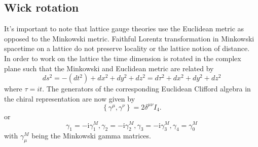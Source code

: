 \documentclass[a4paper,10pt]{book}
\begin{document}
\subsection{Wick rotation}
It's important to note that lattice gauge theories use the Euclidean metric as opposed to the Minkowski metric. Faithful Lorentz transformation in Minkowski spacetime on a lattice do not preserve locality or the lattice notion of distance.\\In order to work on the lattice the time dimension is rotated in the complex plane such that the Minkowski and Euclidean metric are related by 
\begin{equation}
d s^{2}=-\left(d t^{2}\right)+d x^{2}+d y^{2}+d z^{2} = d \tau^{2}+d x^{2}+d y^{2}+d z^{2} 
\end{equation}
where $\tau = it$. The generators of the corresponding Euclidean Clifford algebra in the chiral representation are now given by 
\begin{equation}
\left\{\gamma^{\mu}, \gamma^{\nu}\right\}=2 \delta^{\mu \nu} I_{4}.
\end{equation}
or 
\begin{equation}
\gamma_{1}=-\mathrm{i} \gamma_{1}^{M}, \gamma_{2}=-\mathrm{i} \gamma_{2}^{M}, \gamma_{3}=-\mathrm{i} \gamma_{3}^{M}, \gamma_{4}=\gamma_{0}^{M}
\end{equation}
with $\gamma_{\mu}^{M}$ being the Minkowski gamma matrices.
\end{document}
